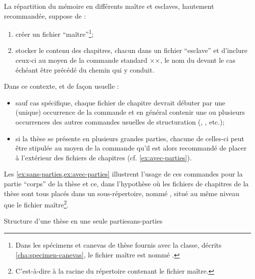 La répartition du mémoire en différents maître et esclaves, hautement
recommandée, suppose de :
\begin{enumerate}
\item créer un fichier \enquote{maître}\footnote{Dans les spécimens et canevas
    de thèse fournis avec la classe, décrits \vref{cha:specimen-canevas}, le
    fichier maître est nommé .};
\item stocker le contenu des chapitres, chacun dans un fichier
  \enquote{esclave}
  et d'inclure ceux-ci au moyen de la commande
  standard ××, le nom du  devant le cas échéant être précédé du chemin qui y
  conduit.
\end{enumerate}
%
Dans ce contexte, et de façon usuelle :
\begin{itemize}
\item sauf cas spécifique, chaque fichier de chapitre devrait débuter par une
  (unique) occurrence de la commande  et en général
  contenir une ou plusieurs occurrences des autres commandes usuelles de
  structuration (, , etc.);
\item si la thèse se présente en plusieurs grandes parties, chacune
  de celles-ci peut être stipulée au moyen de la commande
   qu'il est alors recommandé de placer à
  l'extérieur des fichiers de chapitres (cf.
  \vref{ex:avec-parties}).
\end{itemize}
%
Les \vref{ex:sans-parties,ex:avec-parties} illustrent l'usage de ces commandes
pour la partie \enquote{corps} de la thèse et ce, dans l'hypothèse où les
fichiers de chapitres de la thèse sont tous placés dans un sous-répertoire,
nommé , situé au même niveau que le fichier
maître\footnote{C'est-à-dire à la racine du répertoire contenant le fichier
  maître.}.
\begin{dbexample}{Structure d'une thèse en une seule partie}{sans-parties}
\begin{bodycode}
÷}
÷}
...
÷}
÷}
\end{bodycode}
\end{dbexample}

